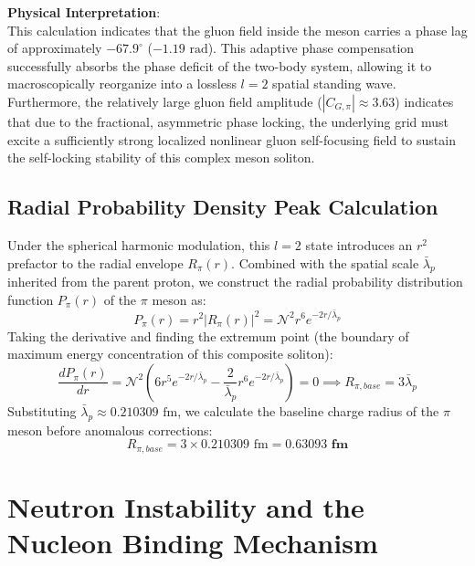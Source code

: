 \documentclass[12pt, a4paper]{article}
\begin{document}
\textbf{Physical Interpretation}: \\
This calculation indicates that the gluon field inside the meson carries a phase lag of approximately $-67.9^\circ$ ($-1.19 \text{ rad}$). This adaptive phase compensation successfully absorbs the phase deficit of the two-body system, allowing it to macroscopically reorganize into a lossless $l=2$ spatial standing wave. Furthermore, the relatively large gluon field amplitude ($|C_{G,\pi}| \approx 3.63$) indicates that due to the fractional, asymmetric phase locking, the underlying grid must excite a sufficiently strong localized nonlinear gluon self-focusing field to sustain the self-locking stability of this complex meson soliton.


\subsection{Radial Probability Density Peak Calculation}

Under the spherical harmonic modulation, this $l=2$ state introduces an $r^2$ prefactor to the radial envelope $R_\pi(r)$. Combined with the spatial scale $\bar{\lambda}_p$ inherited from the parent proton, we construct the radial probability distribution function $P_\pi(r)$ of the $\pi$ meson as:
\begin{equation}
P_\pi(r) = r^2 |R_\pi(r)|^2 = \mathcal{N}^2 r^6 e^{-2r/\bar{\lambda}_p} \label{eq:meson_radial}
\end{equation}
Taking the derivative and finding the extremum point (the boundary of maximum energy concentration of this composite soliton):
\begin{equation}
\frac{dP_\pi(r)}{dr} = \mathcal{N}^2 \left( 6r^5 e^{-2r/\bar{\lambda}_p} - \frac{2}{\bar{\lambda}_p} r^6 e^{-2r/\bar{\lambda}_p} \right) = 0 \implies R_{\pi, base} = 3 \bar{\lambda}_p \label{eq:meson_deriv}
\end{equation}
Substituting $\bar{\lambda}_p \approx 0.210309 \text{ fm}$, we calculate the baseline charge radius of the $\pi$ meson before anomalous corrections:
\begin{equation}
R_{\pi, base} = 3 \times 0.210309 \text{ fm} = \mathbf{0.63093 \text{ fm}} \label{eq:meson_radius_val}
\end{equation}

\section{Neutron Instability and the Nucleon Binding Mechanism}
\end{document}
